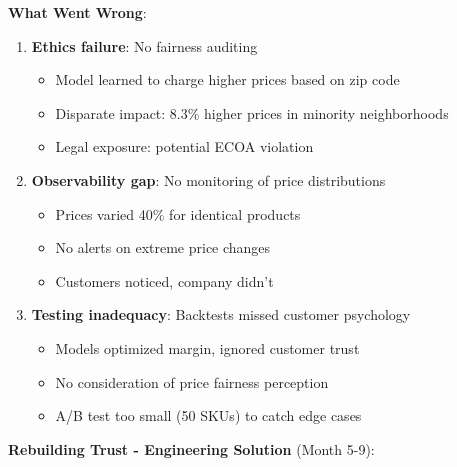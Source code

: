 \textbf{What Went Wrong}:
\begin{enumerate}
    \item \textbf{Ethics failure}: No fairness auditing
        \begin{itemize}
            \item Model learned to charge higher prices based on zip code
            \item Disparate impact: 8.3\% higher prices in minority neighborhoods
            \item Legal exposure: potential ECOA violation
        \end{itemize}

    \item \textbf{Observability gap}: No monitoring of price distributions
        \begin{itemize}
            \item Prices varied 40\% for identical products
            \item No alerts on extreme price changes
            \item Customers noticed, company didn't
        \end{itemize}

    \item \textbf{Testing inadequacy}: Backtests missed customer psychology
        \begin{itemize}
            \item Models optimized margin, ignored customer trust
            \item No consideration of price fairness perception
            \item A/B test too small (50 SKUs) to catch edge cases
        \end{itemize}
\end{enumerate}

\textbf{Rebuilding Trust - Engineering Solution} (Month 5-9):


